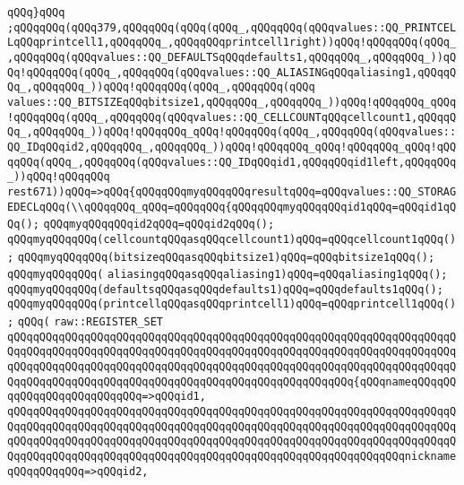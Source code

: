 \verb|qQQq}qQQq|\newline
\verb|;qQQqqQQq(qQQq379,qQQqqQQq(qQQq(qQQq_,qQQqqQQq(qQQqvalues::QQ_PRINTCELLqQQqprintcell1,qQQqqQQq_,qQQqqQQqprintcell1right))qQQq!qQQqqQQq(qQQq_,qQQqqQQq(qQQqvalues::QQ_DEFAULTSqQQqdefaults1,qQQqqQQq_,qQQqqQQq_))qQQq!qQQqqQQq(qQQq_,qQQqqQQq(qQQqvalues::QQ_ALIASINGqQQqaliasing1,qQQqqQQq_,qQQqqQQq_))qQQq!qQQqqQQq(qQQq_,qQQqqQQq(qQQq|\newline
\verb|values::QQ_BITSIZEqQQqbitsize1,qQQqqQQq_,qQQqqQQq_))qQQq!qQQqqQQq_qQQq!qQQqqQQq(qQQq_,qQQqqQQq(qQQqvalues::QQ_CELLCOUNTqQQqcellcount1,qQQqqQQq_,qQQqqQQq_))qQQq!qQQqqQQq_qQQq!qQQqqQQq(qQQq_,qQQqqQQq(qQQqvalues::QQ_IDqQQqid2,qQQqqQQq_,qQQqqQQq_))qQQq!qQQqqQQq_qQQq!qQQqqQQq_qQQq!qQQqqQQq(qQQq_,qQQqqQQq(qQQqvalues::QQ_IDqQQqid1,qQQqqQQqid1left,qQQqqQQq_))qQQq!qQQqqQQq|\newline
\verb|rest671))qQQq=>qQQq{qQQqqQQqmyqQQqqQQqresultqQQq=qQQqvalues::QQ_STORAGEDECLqQQq(\\qQQqqQQq_qQQq=qQQqqQQq{qQQqqQQqmyqQQqqQQqid1qQQq=qQQqid1qQQq();|\newline
\verb|qQQqmyqQQqqQQqid2qQQq=qQQqid2qQQq();|\newline
\verb|qQQqmyqQQqqQQq(cellcountqQQqasqQQqcellcount1)qQQq=qQQqcellcount1qQQq();|\newline
\verb|qQQqmyqQQqqQQq(bitsizeqQQqasqQQqbitsize1)qQQq=qQQqbitsize1qQQq();|\newline
\verb|qQQqmyqQQqqQQq(|\newline
\verb|aliasingqQQqasqQQqaliasing1)qQQq=qQQqaliasing1qQQq();|\newline
\verb|qQQqmyqQQqqQQq(defaultsqQQqasqQQqdefaults1)qQQq=qQQqdefaults1qQQq();|\newline
\verb|qQQqmyqQQqqQQq(printcellqQQqasqQQqprintcell1)qQQq=qQQqprintcell1qQQq();|\newline
\verb|qQQq(|\newline
\verb|raw::REGISTER_SET|\newline
\verb|qQQqqQQqqQQqqQQqqQQqqQQqqQQqqQQqqQQqqQQqqQQqqQQqqQQqqQQqqQQqqQQqqQQqqQQqqQQqqQQqqQQqqQQqqQQqqQQqqQQqqQQqqQQqqQQqqQQqqQQqqQQqqQQqqQQqqQQqqQQqqQQqqQQqqQQqqQQqqQQqqQQqqQQqqQQqqQQqqQQqqQQqqQQqqQQqqQQqqQQqqQQqqQQqqQQqqQQqqQQqqQQqqQQqqQQqqQQqqQQqqQQqqQQqqQQqqQQqqQQqqQQq{qQQqnameqQQqqQQqqQQqqQQqqQQqqQQqqQQq=>qQQqid1,|\newline
\verb|qQQqqQQqqQQqqQQqqQQqqQQqqQQqqQQqqQQqqQQqqQQqqQQqqQQqqQQqqQQqqQQqqQQqqQQqqQQqqQQqqQQqqQQqqQQqqQQqqQQqqQQqqQQqqQQqqQQqqQQqqQQqqQQqqQQqqQQqqQQqqQQqqQQqqQQqqQQqqQQqqQQqqQQqqQQqqQQqqQQqqQQqqQQqqQQqqQQqqQQqqQQqqQQqqQQqqQQqqQQqqQQqqQQqqQQqqQQqqQQqqQQqqQQqqQQqqQQqqQQqqQQqqQQqqQQqnicknameqQQqqQQqqQQq=>qQQqid2,|\newline
